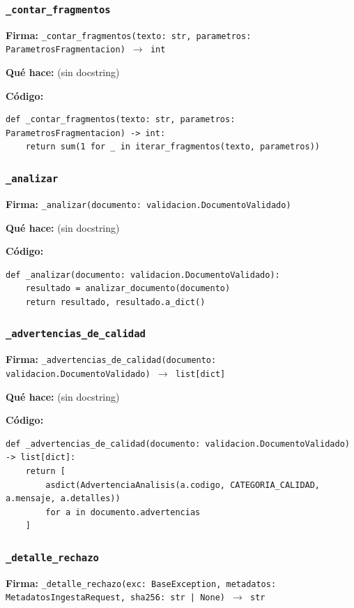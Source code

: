 \documentclass[11pt,a4paper]{article}
\begin{document}
\subsubsection*{\texttt{\_contar\_fragmentos}}
\textbf{Firma:} \texttt{\_contar\_fragmentos(texto: str, parametros: ParametrosFragmentacion) $\rightarrow$ int}

\textbf{Qué hace:} (sin docstring)

\textbf{Código:}
\begin{lstlisting}
def _contar_fragmentos(texto: str, parametros: ParametrosFragmentacion) -> int:
    return sum(1 for _ in iterar_fragmentos(texto, parametros))
\end{lstlisting}

\subsubsection*{\texttt{\_analizar}}
\textbf{Firma:} \texttt{\_analizar(documento: validacion.DocumentoValidado)}

\textbf{Qué hace:} (sin docstring)

\textbf{Código:}
\begin{lstlisting}
def _analizar(documento: validacion.DocumentoValidado):
    resultado = analizar_documento(documento)
    return resultado, resultado.a_dict()
\end{lstlisting}

\subsubsection*{\texttt{\_advertencias\_de\_calidad}}
\textbf{Firma:} \texttt{\_advertencias\_de\_calidad(documento: validacion.DocumentoValidado) $\rightarrow$ list[dict]}

\textbf{Qué hace:} (sin docstring)

\textbf{Código:}
\begin{lstlisting}
def _advertencias_de_calidad(documento: validacion.DocumentoValidado) -> list[dict]:
    return [
        asdict(AdvertenciaAnalisis(a.codigo, CATEGORIA_CALIDAD, a.mensaje, a.detalles))
        for a in documento.advertencias
    ]
\end{lstlisting}

\subsubsection*{\texttt{\_detalle\_rechazo}}
\textbf{Firma:} \texttt{\_detalle\_rechazo(exc: BaseException, metadatos: MetadatosIngestaRequest, sha256: str | None) $\rightarrow$ str}
\end{document}
